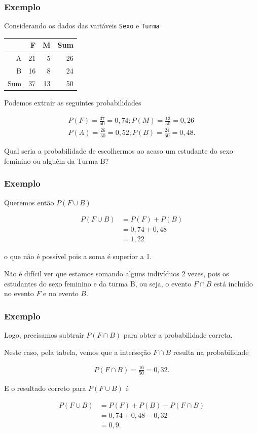 \documentclass[11pt]{beamer}
\begin{document}
\begin{frame}
\frametitle{Exemplo}

Considerando os dados das variáveis \texttt{Sexo} e \texttt{Turma}


\begin{table}[ht]
\centering
\begin{tabular}{rrrr}
  \hline
 & F & M & Sum \\ 
  \hline
A & 21 & 5 & 26 \\ 
  B & 16 & 8 & 24 \\ 
   \hline
Sum & 37 & 13 & 50 \\ 
   \hline
\end{tabular}
\end{table}


Podemos extrair as seguintes probabilidades

\begin{align*}
P(F) = \frac{37}{50} = 0,74; P(M) = \frac{13}{50} = 0,26 \\
P(A) = \frac{26}{50} = 0,52; P(B) = \frac{24}{50} = 0,48.
\end{align*}

Qual seria a probabilidade de escolhermos ao acaso um estudante do sexo
feminino ou alguém da Turma B?
\end{frame}

\begin{frame}
\frametitle{Exemplo}

Queremos então \(P(F \cup B)\)

\begin{align*}
P(F \cup B) &= P(F) + P(B) \\
&= 0,74 + 0,48 \\
&= 1,22
\end{align*}

o que não é possível pois a soma é superior a 1.

Não é difícil ver que estamos somando alguns indivíduos 2 vezes, pois os
estudantes do sexo feminino e da turma B, ou seja, o evento \(F \cap B\)
está incluído no evento \(F\) e no evento \(B\).
\end{frame}

\begin{frame}
\frametitle{Exemplo}

Logo, precisamos subtrair \(P(F \cap B)\) para obter a probabilidade
correta.

Neste caso, pela tabela, vemos que a interseção \(F \cap B\) resulta na
probabilidade

\begin{align*}
P(F \cap B) = \frac{16}{50} = 0,32.
\end{align*}

E o resultado correto para \(P(F \cup B)\) é

\begin{align*}
P(F \cup B) &= P(F) + P(B) - P(F \cap B) \\
&= 0,74 + 0,48 - 0,32 \\
&= 0,9.
\end{align*}
\end{frame}
\end{document}
